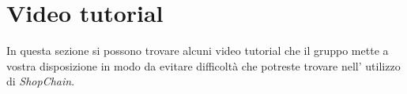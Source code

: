 \section{Video tutorial}\label{section:video_tutorial}
In questa sezione si possono trovare alcuni video tutorial che il gruppo \groupName{} mette a vostra disposizione in modo da evitare difficoltà che potreste trovare nell' utilizzo di \textit{ShopChain}.
